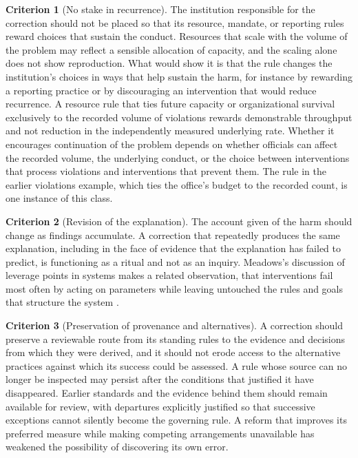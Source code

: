 \documentclass[11pt]{article}
\theoremstyle{definition}
\newtheorem{criterion}{Criterion}
\begin{document}
\begin{criterion}[No stake in recurrence]
The institution responsible for the correction should not be placed so that its resource, mandate, or reporting rules reward choices that sustain the conduct. Resources that scale with the volume of the problem may reflect a sensible allocation of capacity, and the scaling alone does not show reproduction. What would show it is that the rule changes the institution's choices in ways that help sustain the harm, for instance by rewarding a reporting practice or by discouraging an intervention that would reduce recurrence. A resource rule that ties future capacity or organizational survival exclusively to the recorded volume of violations rewards demonstrable throughput and not reduction in the independently measured underlying rate. Whether it encourages continuation of the problem depends on whether officials can affect the recorded volume, the underlying conduct, or the choice between interventions that process violations and interventions that prevent them. The rule in the earlier violations example, which ties the office's budget to the recorded count, is one instance of this class.
\end{criterion}

\begin{criterion}[Revision of the explanation]
The account given of the harm should change as findings accumulate. A correction that repeatedly produces the same explanation, including in the face of evidence that the explanation has failed to predict, is functioning as a ritual and not as an inquiry. Meadows's discussion of leverage points in systems makes a related observation, that interventions fail most often by acting on parameters while leaving untouched the rules and goals that structure the system \cite{meadows1999}.
\end{criterion}

\begin{criterion}[Preservation of provenance and alternatives]
A correction should preserve a reviewable route from its standing rules to the evidence and decisions from which they were derived, and it should not erode access to the alternative practices against which its success could be assessed. A rule whose source can no longer be inspected may persist after the conditions that justified it have disappeared. Earlier standards and the evidence behind them should remain available for review, with departures explicitly justified so that successive exceptions cannot silently become the governing rule. A reform that improves its preferred measure while making competing arrangements unavailable has weakened the possibility of discovering its own error.
\end{criterion}
\end{document}
